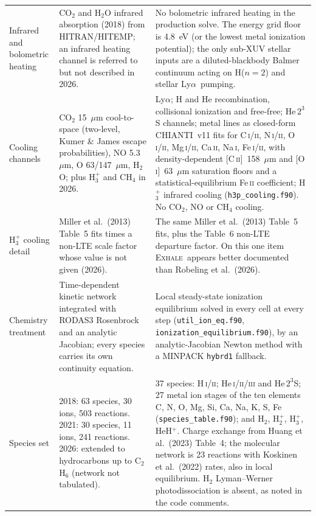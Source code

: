 \documentclass{my_memo}
\newcommand{\EXHALE}{\textsc{Exhale}}
\newcommand{\Lya}{Ly$\alpha$}
\begin{document}
{\begin{longtable}{@{}L{0.155\textwidth}L{0.39\textwidth}L{0.39\textwidth}@{}}
Infrared and bolometric heating &
CO$_2$ and H$_2$O infrared absorption (2018) from HITRAN/HITEMP; an infrared heating channel is
referred to but not described in 2026. &
No bolometric infrared heating in the production solve. The energy grid floor is 4.8~eV (or the
lowest metal ionization potential); the only sub-XUV stellar inputs are a diluted-blackbody
Balmer continuum acting on H($n=2$) and stellar \Lya\ pumping. \\

Cooling channels &
CO$_2$ 15~$\mu$m cool-to-space (two-level, Kumer \& James escape probabilities), NO 5.3~$\mu$m,
O 63/147~$\mu$m, H$_2$O; plus H$_3^+$ and CH$_4$ in 2026. &
\Lya; H and He recombination, collisional ionization and free-free; He\,$2^3$S channels; metal
lines as closed-form CHIANTI~v11 fits for C\,\textsc{i/ii}, N\,\textsc{i/ii}, O\,\textsc{i/ii},
Mg\,\textsc{i/ii}, Ca\,\textsc{ii}, Na\,\textsc{i}, Fe\,\textsc{i/ii}, with density-dependent
[C\,\textsc{ii}]~158~$\mu$m and [O\,\textsc{i}]~63~$\mu$m saturation floors and a
statistical-equilibrium Fe\,\textsc{ii} coefficient; H$_3^+$ infrared cooling
(\texttt{h3p\_cooling.f90}). No CO$_2$, NO or CH$_4$ cooling. \\

H$_3^+$ cooling detail &
Miller et al.\ (2013) Table~5 fits times a non-LTE scale factor whose value is not given
(2026). &
The same Miller et al.\ (2013) Table~5 fits, plus the Table~6 non-LTE departure factor. On this
one item \EXHALE\ appears better documented than Robeling et al.\ (2026). \\

Chemistry treatment &
Time-dependent kinetic network integrated with RODAS3 Rosenbrock and an analytic Jacobian; every
species carries its own continuity equation. &
Local steady-state ionization equilibrium solved in every cell at every step
(\texttt{util\_ion\_eq.f90}, \texttt{ionization\_equilibrium.f90}), by an analytic-Jacobian
Newton method with a MINPACK \texttt{hybrd1} fallback. \\

Species set &
2018: 63 species, 30 ions, 503 reactions. 2021: 30 species, 11 ions, 241 reactions. 2026: extended
to hydrocarbons up to C$_2$H$_6$ (network not tabulated). &
37 species: H\,\textsc{i/ii}; He\,\textsc{i/ii/iii} and He\,$2^3$S; 27 metal ion stages of the ten
elements C, N, O, Mg, Si, Ca, Na, K, S, Fe (\texttt{species\_table.f90}); and H$_2$, H$_2^+$,
H$_3^+$, HeH$^+$. Charge exchange from Huang et al.\ (2023) Table~4; the molecular network is 23
reactions with Koskinen et al.\ (2022) rates, also in local equilibrium. H$_2$ Lyman--Werner
photodissociation is absent, as noted in the code comments. \\


\end{longtable}}
\end{document}
